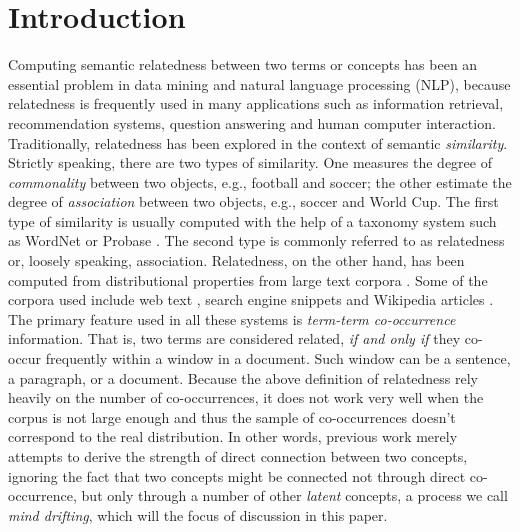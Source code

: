 \section{Introduction}
\label{sec:intro}

Computing semantic relatedness between two terms or concepts has been
an essential problem in data mining and natural language processing (NLP),
because relatedness is frequently used in many applications
such as information retrieval, recommendation systems, question answering
and human computer interaction.
Traditionally, relatedness has been explored in the context of
semantic {\em similarity}. Strictly speaking, there are two types
of similarity. One measures the degree of {\em commonality}
between two objects, e.g., football and soccer;
the other estimate the degree of {\em association}
between two objects, e.g., soccer and World Cup. The first type of similarity
is usually computed with the help of a taxonomy system such as WordNet
\cite{Resnik:1995,Jiang:1997,Lin:1998} or Probase \cite{LiWZWW13}.
The second type is commonly referred to as relatedness or,
loosely speaking, association. Relatedness, on the other hand, has been
computed from distributional properties from large text corpora
\cite{StrubeP06,ChenLW06,GabrilovichM07,BollegalaMI11a}.
Some of the corpora used include web text \cite{LiPeipei:2013}, search engine snippets
\cite{Sahami:2006} and Wikipedia articles \cite{Gabrilovich:2007}.
The primary feature used in all these systems is
{\em term-term co-occurrence} information. That is, two terms
are considered related, {\em if and only if} they co-occur frequently
within a window in a document. Such window can be a sentence, a paragraph,
or a document.
Because the above definition of relatedness rely heavily on
the number of co-occurrences, it does not work very well when the
corpus is not large enough and thus the sample of co-occurrences
doesn't correspond to the real distribution.
In other words, previous work merely attempts to derive
the strength of direct connection between two concepts, ignoring the fact
that two concepts might be connected not through direct co-occurrence, but
only through a number of other {\em latent} concepts,
a process we call {\em mind drifting}, which will the focus of
discussion in this paper.

